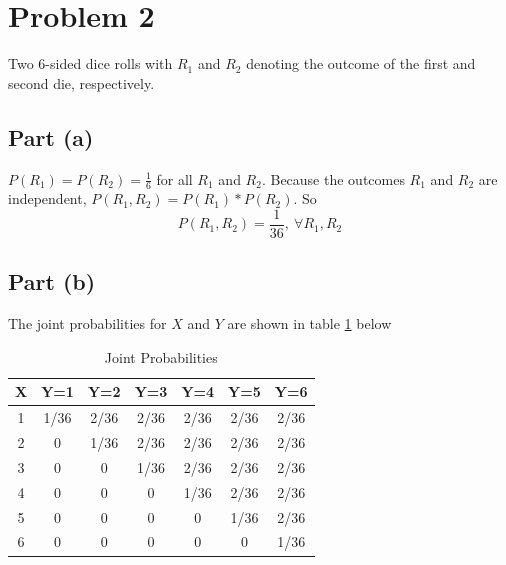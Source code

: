 \documentclass[11pt]{article}
\begin{document}
\section*{Problem 2}
Two 6-sided dice rolls with $R_1$ and $R_2$ denoting the outcome of the first and second die, respectively.

\subsection*{Part (a)}
$P(R_1)=P(R_2)=\frac{1}{6}$ for all $R_1$ and $R_2$. Because the outcomes $R_1$ and $R_2$ are independent, $P(R_1,R_2)=P(R_1)*P(R_2)$. So
\begin{equation*}
	P(R_1,R_2)=\frac{1}{36},\ \forall R_1,R_2
\end{equation*}

\subsection*{Part (b)}
The joint probabilities for $X$ and $Y$ are shown in table \ref{joints} below
\begin{table}[h!]
  \begin{center}
    \caption{Joint Probabilities}
    \label{joints}
    \begin{tabular}{c|c|c|c|c|c|c} %
      X & Y=1 & Y=2 & Y=3 & Y=4 & Y=5 & Y=6 \\
      \hline
      1 & 1/36 & 2/36 & 2/36 & 2/36 & 2/36 & 2/36 \\
      2 & 0 & 1/36 & 2/36 & 2/36 & 2/36 & 2/36 \\
      3 & 0 & 0 & 1/36 & 2/36 & 2/36 & 2/36 \\
      4 & 0 & 0 & 0 & 1/36 & 2/36 & 2/36 \\
      5 & 0 & 0 & 0 & 0 & 1/36 & 2/36 \\
      6 & 0 & 0 & 0 & 0 & 0 & 1/36 \\
    \end{tabular}
  \end{center}
\end{table}
\end{document}

